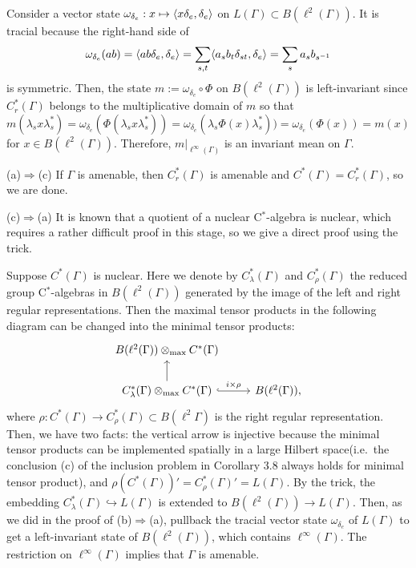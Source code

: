 \documentclass{../../../small}
\begin{document}
\begin{pf}
Consider a vector state $\omega_{\delta_e}:x\mapsto\langle x\delta_e,\delta_e\rangle$ on $L(\Gamma)\subset B(\ell^2(\Gamma))$.
It is tracial because the right-hand side of
\[\omega_{\delta_e}(ab)=\langle ab\delta_e,\delta_e\rangle=\sum_{s,t}\langle a_sb_t\delta_{st},\delta_e\rangle=\sum_sa_sb_{s^{-1}}\]
is symmetric.
Then, the state $m:=\omega_{\delta_e}\circ\Phi$ on $B(\ell^2(\Gamma))$ is left-invariant since $C_r^*(\Gamma)$ belongs to the multiplicative domain of $m$ so that
\[m(\lambda_sx\lambda_s^*)=\omega_{\delta_e}(\Phi(\lambda_sx\lambda_s^*))=\omega_{\delta_e}(\lambda_s\Phi(x)\lambda_s^*))=\omega_{\delta_e}(\Phi(x))=m(x)\]
for $x\in B(\ell^2(\Gamma))$.
Therefore, $m|_{\ell^\infty(\Gamma)}$ is an invariant mean on $\Gamma$.

(a)$\Rightarrow$(c)
If $\Gamma$ is amenable, then $C_r^*(\Gamma)$ is amenable and $C^*(\Gamma)=C_r^*(\Gamma)$, so we are done.

(c)$\Rightarrow$(a)
It is known that a quotient of a nuclear C$^*$-algebra is nuclear, which requires a rather difficult proof in this stage, so we give a direct proof using the trick.

Suppose $C^*(\Gamma)$ is nuclear.
Here we denote by $C_\lambda^*(\Gamma)$ and $C_\rho^*(\Gamma)$ the reduced group C$^*$-algebras in $B(\ell^2(\Gamma))$ generated by the image of the left and right regular representations.
Then the maximal tensor products in the following diagram can be changed into the minimal tensor products:
\[\begin{tikzcd}
B(\ell^2(\Gamma))\otimes_{\max}C^*(\Gamma) &\\
C_\lambda^*(\Gamma)\otimes_{\max}C^*(\Gamma)\ar[hook]{r}{i\times\rho} \ar{u} & B(\ell^2(\Gamma)),
\end{tikzcd}\]
where $\rho:C^*(\Gamma)\to C_\rho^*(\Gamma)\subset B(\ell^2\Gamma)$ is the right regular representation.
Then, we have two facts: the vertical arrow is injective because the minimal tensor products can be implemented spatially in a large Hilbert space(i.e.~the conclusion (c) of the inclusion problem in Corollary 3.8 always holds for minimal tensor product), and $\rho(C^*(\Gamma))'=C_\rho^*(\Gamma)'=L(\Gamma)$.
By the trick, the embedding $C_\lambda^*(\Gamma)\hookrightarrow L(\Gamma)$ is extended to $B(\ell^2(\Gamma))\to L(\Gamma)$.
Then, as we did in the proof of (b)$\Rightarrow$(a), pullback the tracial vector state $\omega_{\delta_e}$ of $L(\Gamma)$ to get a left-invariant state of $B(\ell^2(\Gamma))$, which contains $\ell^\infty(\Gamma)$.
The restriction on $\ell^\infty(\Gamma)$ implies that $\Gamma$ is amenable.
\end{pf}
\end{document}
